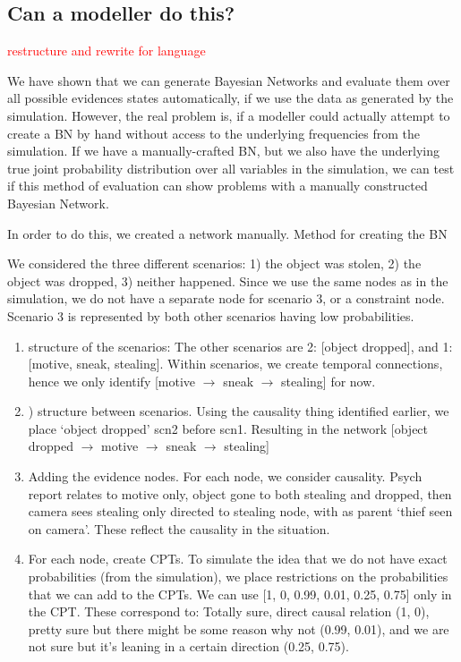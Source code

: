 \documentclass[12pt]{article}
\begin{document}
\subsection{Can a modeller do this?}



 \textcolor{red} {restructure and rewrite for language}


We have shown that we can generate Bayesian Networks and evaluate them over all possible evidences states automatically, if we use the data as generated by the simulation. However, the real problem is, if a modeller could actually attempt to create a BN by hand without access to the underlying frequencies from the simulation. If we have a manually-crafted BN, but we also have the underlying true joint probability distribution over all variables in the simulation, we can test if this method of evaluation can show problems with a manually constructed Bayesian Network.

In order to do this, we created a network manually.  
 Method for creating the BN
 
 We considered the three different scenarios: 1) the object was stolen, 2) the object was dropped, 3) neither happened. Since we use the same nodes as in the simulation, we do not have a separate node for scenario 3, or a constraint node. Scenario 3 is represented by both other scenarios having low probabilities.
 
 \begin{enumerate} 
 
\item structure of the scenarios: The other scenarios are 2: [object dropped], and 1: [motive, sneak, stealing]. Within scenarios, we create temporal connections, hence we only identify [motive $\rightarrow$ sneak $\rightarrow$ stealing] for now.
\item) structure between scenarios. Using the causality thing identified earlier, we place `object dropped' scn2 before scn1. Resulting in the network [object dropped $\rightarrow$ motive $\rightarrow$ sneak $\rightarrow$ stealing]
\item Adding the evidence nodes. For each node, we consider causality. Psych report relates to motive only, object gone to both stealing and dropped, then camera sees stealing only directed  to stealing node, with as parent `thief seen on camera'.  These reflect the causality in the situation.
\item For each node, create CPTs. To simulate the idea that we do not have exact probabilities (from the simulation), we place restrictions on the probabilities that we can add to the CPTs. We can use [1, 0, 0.99, 0.01, 0.25, 0.75] only in the CPT. These correspond to: Totally sure, direct causal relation (1, 0), pretty sure but there might be some reason why not (0.99, 0.01), and we are not sure but it's leaning in a certain direction (0.25, 0.75).
 
 \end{enumerate}
 
\end{document}
